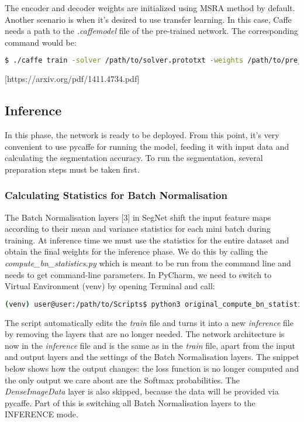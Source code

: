 The encoder and decoder weights are initialized using MSRA method by default. Another scenario is when it's desired to use transfer learning. In this case, Caffe needs a path to the \textit{.caffemodel} file of the pre-trained network. The corresponding command would be:

\begin{lstlisting}[language=bash]
$ ./caffe train -solver /path/to/solver.prototxt -weights /path/to/pre_trained_weights.caffemodel
\end{lstlisting}

 [https://arxiv.org/pdf/1411.4734.pdf]

\subsection{Inference}

In this phase, the network is ready to be deployed. From this point, it's very convenient to use pycaffe for running the model, feeding it with input data and calculating the segmentation accuracy. To run the segmentation, several preparation steps must be taken first.

\subsubsection{Calculating Statistics for Batch Normalisation}
The Batch Normalisation layers [3] in SegNet shift the input feature maps according to their mean and variance statistics for each mini batch during training. At inference time we must use the statistics for the entire dataset and obtain the final weights for the inference phase. We do this by calling the \textit{compute\_bn\_statistics.py} which is meant to be run from the command line and needs to get command-line parameters. In PyCharm, we need to switch to Virtual Environment (venv) by opening Terminal and call:

\begin{lstlisting}[language=bash]
(venv) user@user:/path/to/Scripts$ python3 original_compute_bn_statistics.py /path/to/train.prototxt /path/to/snap_iter_XY.caffemodel /path/to/inference_folder
\end{lstlisting}

The script automatically edits the \textit{train} file and turns it into a new \textit{inference} file by removing the layers that are no longer needed. The network architecture is now in the \textit{inference} file and is the same as in the \textit{train} file, apart from the input and output layers and the settings of the Batch Normalisation layers. The snippet below shows how the output changes: the loss function is no longer computed and the only output we care about are the Softmax probabilities. The \textit{DenseImageData} layer is also skipped, because the data will be provided via pycaffe. Part of this is switching all Batch Normalisation layers to the INFERENCE mode.

